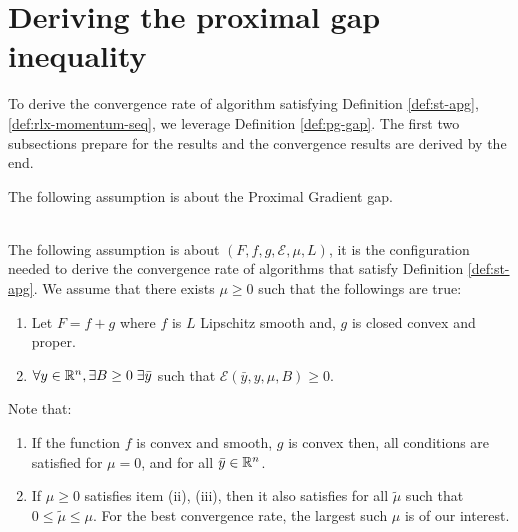 \documentclass[12pt]{article}
\begin{document}
\section{Deriving the proximal gap inequality}
    To derive the convergence rate of algorithm satisfying Definition \ref{def:st-apg}, \ref{def:rlx-momentum-seq}, we leverage Definition \ref{def:pg-gap}. 
    The first two subsections prepare for the results and the convergence results are derived by the end. 
    \par
    The following assumption is about the Proximal Gradient gap. 
    \begin{assumption}\;\label{ass:pggap-dscnt}\\
        The following assumption is about $(F, f, g, \mathcal E, \mu, L)$, it is the configuration needed to derive the convergence rate of algorithms that satisfy Definition \ref{def:st-apg}. 
        We assume that there exists $\mu \ge 0$ such that the followings are true: 
        \begin{enumerate}[nosep]
            \item\label{ass:pggap-dscnt-itm1} Let $F = f + g$ where $f$ is $L$ Lipschitz smooth and, $g$ is closed convex and proper.
            \item\label{ass:pggap-dscnt-itm2} $\forall y \in \mathbb R^n, \exists B \ge 0\; \exists \bar y$ such that $\mathcal E(\bar y, y, \mu, B) \ge 0$. 
        \end{enumerate}
    \end{assumption}
    \begin{remark}
        Note that:
        \begin{enumerate}
            \item If the function $f$ is convex and smooth, $g$ is convex then, all conditions are satisfied for $\mu = 0$, and for all $\bar y \in \mathbb R^n$. 
            \item If $\mu \ge 0$ satisfies item (ii), (iii), then it also satisfies for all $\tilde \mu$ such that $0 \le \tilde \mu \le \mu$. For the best convergence rate, the largest such $\mu$ is of our interest. 
        \end{enumerate}
    \end{remark}
\end{document}
